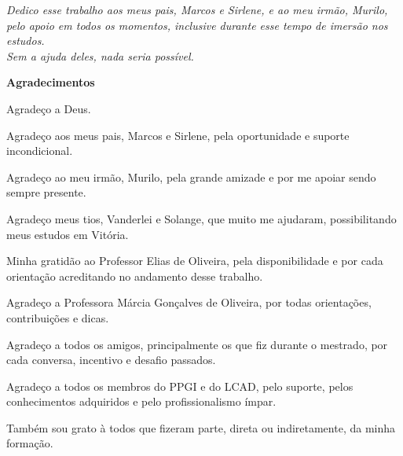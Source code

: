 \newpage
\vspace*{\fill}
\begin{flushright}
  \emph{Dedico esse trabalho aos meus pais, Marcos e Sirlene, e ao meu irmão, Murilo, pelo apoio em todos os momentos, inclusive durante esse tempo de imersão nos estudos.\\ Sem a ajuda deles, nada seria possível.}
\end{flushright}



















\newpage

\vspace*{4cm}

{
\bfseries
\fontsize{18}{22}\selectfont
Agradecimentos
}

\vspace*{0.5cm}

Agradeço a Deus.

Agradeço aos meus pais, Marcos e Sirlene, pela oportunidade e suporte incondicional.

Agradeço ao meu irmão, Murilo, pela grande amizade e por me apoiar sendo sempre presente.

Agradeço meus tios, Vanderlei e Solange, que muito me ajudaram, possibilitando meus estudos em Vitória.

Minha gratidão ao Professor Elias de Oliveira, pela disponibilidade e por cada orientação acreditando no andamento desse trabalho. 

Agradeço a Professora Márcia Gonçalves de Oliveira, por todas orientações, contribuições e dicas.

Agradeço a todos os amigos, principalmente os que fiz durante o mestrado, por cada conversa, incentivo e desafio passados.

Agradeço a todos os membros do PPGI e do LCAD, pelo suporte, pelos conhecimentos adquiridos e pelo profissionalismo ímpar.

Também sou grato à todos que fizeram parte, direta ou indiretamente, da minha formação.

